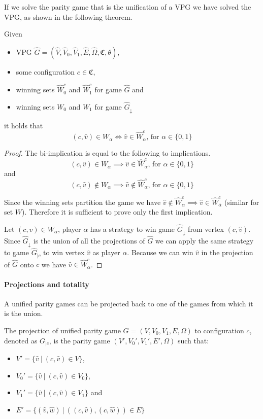If we solve the parity game that is the unification of a VPG we have solved the VPG, as shown in the following theorem.
\begin{theorem}
	\label{theA_solve_UVPG_is_solve_VPG}
	Given 
	\begin{itemize}
		\item VPG $\hat{G} =  (\hat{V},\hat{V}_0,\hat{V}_1, \hat{E},\hat{\Omega}, \mathfrak{C},\theta)$,
		\item some configuration $c \in \mathfrak{C}$,
		\item winning sets $\hat{W}^c_0$ and $\hat{W}^c_1$ for game $\hat{G}$ and
		\item winning sets $W_0$ and $W_1$ for game $\hat{G}_{\downarrow}$
	\end{itemize}
	it holds that
	\[(c,\hat{v}) \in W_\alpha \iff \hat{v} \in \hat{W}^c_\alpha  \text{, for }\alpha \in \{0,1\}  \]
	\begin{proof}
		The bi-implication is equal to  the following to implications.
		\[ (c,\hat{v}) \in W_\alpha \implies \hat{v} \in \hat{W}^c_\alpha  \text{, for }\alpha \in \{0,1\} \]
		and
		\[ (c,\hat{v}) \notin W_\alpha\implies \hat{v} \notin \hat{W}^c_\alpha \text{, for }\alpha \in \{0,1\}  \]
		
		Since the winning sets partition the game we have $\hat{v} \notin \hat{W}^c_\alpha \implies \hat{v} \in \hat{W}^c_{\overline{\alpha}}$ (similar for set $W$). Therefore it is sufficient to prove only the first implication.
		
		Let $(c,\hat{v}) \in W_\alpha$, player $\alpha$ has a strategy to win game $\hat{G}_{\downarrow}$ from vertex $(c,\hat{v})$. Since $\hat{G}_{\downarrow}$ is the union of all the projections of $\hat{G}$ we can apply the same strategy to game $\hat{G}_{|c}$ to win vertex $\hat{v}$ as player $\alpha$. Because we can win $\hat{v}$ in the projection of $\hat{G}$ onto $c$ we have $\hat{v} \in \hat{W}^c_\alpha$.
	\end{proof}
\end{theorem}


\paragraph{Projections and totality}
A unified parity games can be projected back to one of the games from which it is the union.
\begin{definition}
	The projection of unified parity game $G = (V,V_0, V_1,E,{\Omega})$ to configuration $c$, denoted as $G_{|c}$, is the parity game $(V',V_0',V_1',E',\Omega)$ such that:
	\begin{itemize}
		\item $V' = \{\hat{v}\ |\ (c,\hat{v}) \in V \}$,
		\item $V_0' = \{\hat{v}\ |\ (c,\hat{v}) \in V_0 \}$,
		\item $V_1' = \{\hat{v}\ |\ (c,\hat{v}) \in V_1 \}$ and
		\item $E' = \{ (\hat{v},\hat{w})\ |\ ((c,\hat{v}),(c,\hat{w})) \in E \} $
	\end{itemize}
\end{definition}

